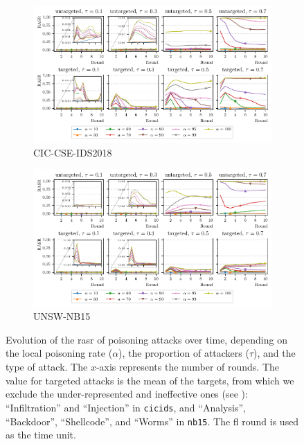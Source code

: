 \begin{figure}
  \centering
  \begin{subfigure}{\linewidth}
    \centering
    \includegraphics[width=\linewidth]{figures/cicids/attacks}
    \caption{
      CIC-CSE-IDS2018
      \label{fig:assess.threshold.cicids}
    }
  \end{subfigure}
  \begin{subfigure}{\linewidth}
    \centering
    \includegraphics[width=\linewidth]{figures/nb15/attacks}
    \caption{
      UNSW-NB15
      \label{fig:assess.threshold.nb15}
    }
  \end{subfigure}
  \caption[
    Evolution of the \gls{rasr} of poisoning attacks over time, depending on the local poisoning rate ($\alpha$), the proportion of attackers ($\tau$), and the type of attack.
  ]{
    Evolution of the \gls{rasr} of poisoning attacks over time, depending on the local poisoning rate ($\alpha$), the proportion of attackers ($\tau$), and the type of attack.
    The $x$-axis represents the number of rounds.
    The value for targeted attacks is the mean of the targets, from which we exclude the under-represented and ineffective ones (see ): ``Infiltration'' and ``Injection'' in \texttt{cicids}, and ``Analysis'', ``Backdoor'', ``Shellcode'', and ``Worms'' in \texttt{nb15}.
    The \gls{fl} round is used as the time unit.
    \label{fig:assess.threshold}
  }
\end{figure}

